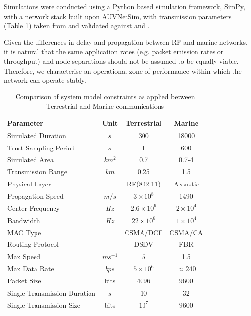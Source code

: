 \documentclass[conference]{IEEEtran}
\providecommand{\DIFadd}[1]{{\protect\color{blue}\uwave{#1}}} %
\providecommand{\DIFaddbegin}{} %
\providecommand{\DIFaddend}{} %
\begin{document}
Simulations were conducted using a Python based simulation framework, SimPy\cite{Mueller2003SimPy}, with a network stack built upon AUVNetSim\cite{Miquel2008}, with transmission parameters (Table \ref{tab:sysconstraints}) taken from and validated against \cite{Stojanovic2007} and \cite{Stefanov2011}.

Given the differences in delay and propagation between RF and marine networks, it is natural that the same application rates (e.g. packet emission rates or throughput) and node separations should not be assumed to be equally viable.
Therefore, we \DIFaddbegin \DIFadd{first }\DIFaddend characterise an operational zone of performance within which the network can operate stably.
%
\begin{table}[h]
  \caption{Comparison of system model constraints as applied between Terrestrial and Marine communications} \label{tab:sysconstraints}
  \begin{center}
    \setlength{\tabcolsep}{8pt}
    \begin{tabular}{lccc}
      \toprule
      Parameter & Unit & Terrestrial & Marine \\
      \midrule
      Simulated Duration & $s$ & 300 & 18000\\
      Trust Sampling Period & $s$ & 1 & 600 \\
      Simulated Area & $km^2$ & 0.7 & 0.7-4 \\
      Transmission Range & $km$ & 0.25 & 1.5 \\
      Physical Layer & & RF(802.11) & Acoustic\\
      Propagation Speed& $m/s$ & $3\times10^8$ & 1490\\
      Center Frequency& $Hz$ & $2.6\times10^9$ & $2 \times 10^4$ \\
      Bandwidth& $Hz$ & $22\times10^6$ & $1\times10^4$\\
      MAC Type & & CSMA/DCF & CSMA/CA\\
      Routing Protocol & & DSDV & FBR \\
      Max Speed & $ms^{-1}$ & 5 & 1.5 \\
      Max Data Rate & $bps$ & $5\times10^6$ & $\approx 240$ \\
      Packet Size & bits & 4096 &  9600 \\
      Single Transmission Duration & $s$ & 10 & 32 \\
      Single Transmission Size & bits & $10^7$ & $9600$ \\
      \bottomrule
    \end{tabular}
    \setlength{\tabcolsep}{6pt}
  \end{center}
\end{table}
%
\end{document}
